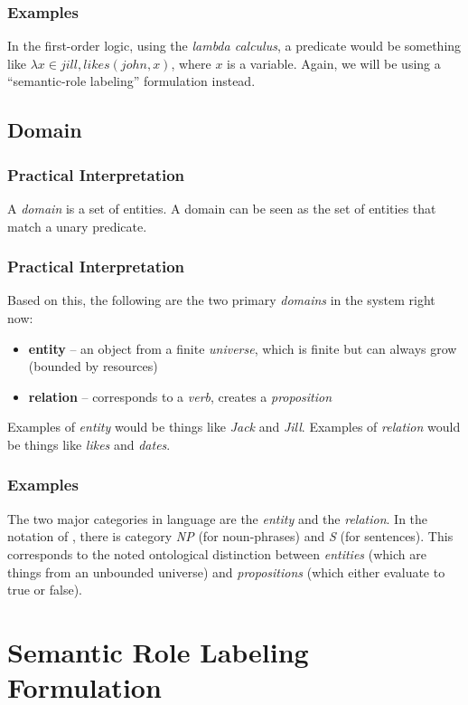 \documentclass[12pt]{article}
\begin{document}
\subsubsection{Examples}
In the first-order logic, using the {\em lambda calculus}, a predicate would be something like $\lambda x \in jill, likes(john, x)$, where $x$ is a variable.
Again, we will be using a ``semantic-role labeling'' formulation instead.

\subsection{Domain}
\subsubsection{Practical Interpretation}
A {\em domain} is a set of entities.
A domain can be seen as the set of entities that match a unary predicate.

\subsubsection{Practical Interpretation}
Based on this, the following are the two primary {\em domains} in the system right now:
\begin{itemize}
    \item {\bf entity} -- an object from a finite {\em universe}, which is finite but can always grow (bounded by resources)
    \item {\bf relation} -- corresponds to a {\em verb}, creates a {\em proposition}
\end{itemize}
Examples of {\em entity} would be things like {\em Jack} and {\em Jill}.
Examples of {\em relation} would be things like {\em likes} and {\em dates}.

\subsubsection{Examples}
The two major categories in language are the {\em entity} and the {\em relation}.
In the notation of \cite{steedman}, there is category {\em NP} (for noun-phrases) and {\em S} (for sentences).
This corresponds to the noted ontological distinction between {\em entities} (which are things from an unbounded universe) and {\em propositions} (which either evaluate to true or false).



\section{Semantic Role Labeling Formulation}
\end{document}
